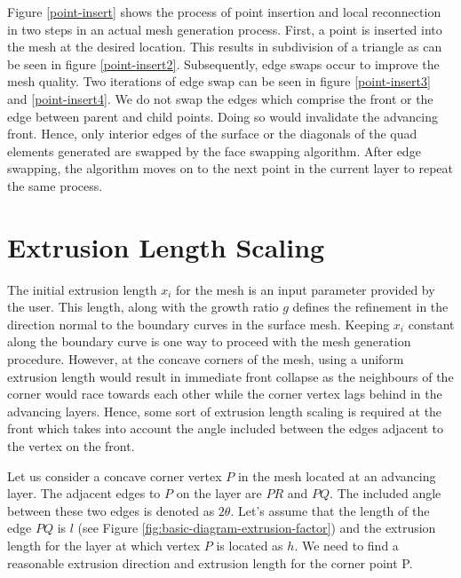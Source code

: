 Figure \ref{point-insert} shows the process of point insertion and local reconnection in two steps in an actual mesh generation process. First, a point is inserted into the mesh at the desired location. This results in subdivision of a triangle as can be seen in figure \ref{point-insert2}. Subsequently, edge swaps occur to improve the mesh quality. Two iterations of edge swap can be seen in figure \ref{point-insert3} and \ref{point-insert4}. We do not swap the edges which comprise the front or the edge between parent and child points. Doing so would invalidate the advancing front. Hence, only interior edges of the surface or the diagonals of the quad elements generated are swapped by the face swapping algorithm. After edge swapping, the algorithm moves on to the next point in the current layer to repeat the same process.


\section{Extrusion Length Scaling}

The initial extrusion length $x_i$ for the mesh is an input parameter provided by the user. This length, along with the growth ratio $g$ defines the refinement in the direction normal to the boundary curves in the surface mesh. Keeping $x_i$ constant along the boundary curve is one way to proceed with the mesh generation procedure. However, at the concave corners of the mesh, using a uniform extrusion length would result in immediate front collapse as the neighbours of the corner would race towards each other while the corner vertex lags behind in the advancing layers. Hence, some sort of extrusion length scaling is required at the front which takes into account the angle included between the edges adjacent to the vertex on the front.


Let us consider a concave corner vertex $P$ in the mesh located at an advancing layer. The adjacent edges to $P$ on the layer are $PR$ and $PQ$. The included angle between these two edges is denoted as $2\theta$. Let's assume that the length of the edge $PQ$ is $l$ (see Figure \ref{fig:basic-diagram-extrusion-factor}) and the extrusion length for the layer at which vertex $P$ is located as $h$. We need to find a reasonable extrusion direction and extrusion length for the corner point P.

